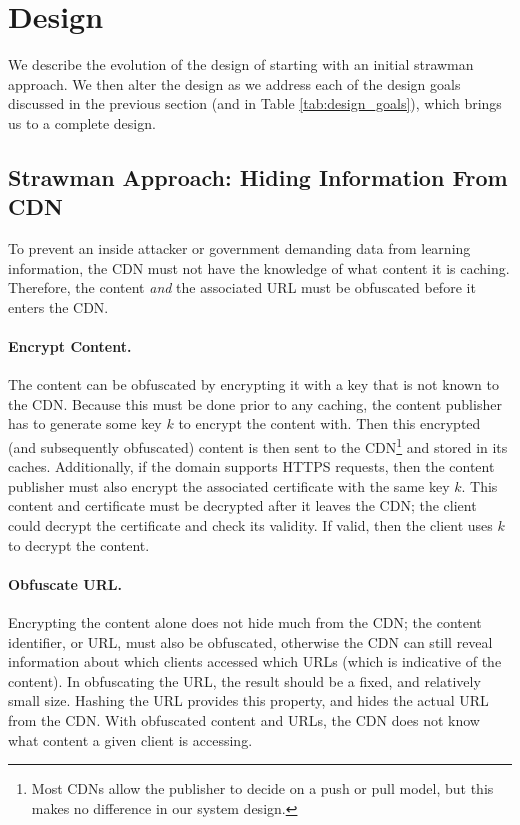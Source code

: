 \section{Design}
\label{sec:design}
We describe the evolution of the design of \system{} starting with an initial strawman approach.  We then 
alter the design as we address each of the design goals discussed in the previous section (and in Table \ref{tab:design_goals}), which brings us 
to a complete design.

\subsection{Strawman Approach: Hiding Information From CDN}
\label{sec:obfuscate_content}
To prevent an inside attacker or government demanding data from learning information, the CDN 
must not have the knowledge of what content it is caching.  Therefore, the content {\it and} the 
associated URL must be obfuscated before it enters the CDN.  

\paragraph{Encrypt Content.}  The content can be obfuscated by encrypting it with a key that is not 
known to the CDN.  Because this must be done prior to any caching, the content publisher 
has to generate some key $k$ to encrypt the content with.  Then this encrypted (and subsequently 
obfuscated) content is then sent to the CDN\footnote{Most CDNs
allow the publisher to decide on a push or pull model, but this makes no difference in our 
system design.} and stored in its caches.  
Additionally, if the domain supports HTTPS requests, then the content publisher must also encrypt the 
associated certificate with the same key $k$.  This content and certificate must be decrypted after 
it leaves the CDN; the client could decrypt the certificate and check its validity.  If valid, then 
the client uses $k$ to decrypt the content.  

\paragraph{Obfuscate URL.} Encrypting the content alone does not hide much from the CDN; the content 
identifier, or URL, must also be obfuscated, otherwise the CDN can still reveal information about 
which clients accessed which URLs (which is indicative of the content).  In obfuscating the 
URL, the result should be a fixed, and relatively small size.  Hashing the URL provides this 
property, and hides the actual URL from the CDN. With obfuscated content and 
URLs, the CDN does not know what content a given client is accessing.

